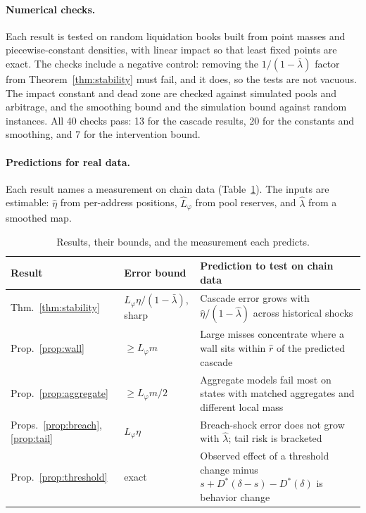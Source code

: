 \documentclass[letterpaper]{article} %
\theoremstyle{remark}
\newcommand{\Dstar}[1]{D^{\ast}_{#1}}
\newcommand{\Lp}{L_\varphi}
\newcommand{\lb}{\bar\lambda}
\begin{document}
\paragraph{Numerical checks.} Each result is tested on random liquidation books built from point masses and piecewise-constant densities, with linear impact so that least fixed points are exact. The checks include a negative control: removing the $1/(1-\lb)$ factor from Theorem~\ref{thm:stability} must fail, and it does, so the tests are not vacuous. The impact constant and dead zone are checked against simulated pools and arbitrage, and the smoothing bound and the simulation bound against random instances. All 40 checks pass: 13 for the cascade results, 20 for the constants and smoothing, and 7 for the intervention bound.

\paragraph{Predictions for real data.} Each result names a measurement on chain data (Table~\ref{tab:predictions}). The inputs are estimable: $\hat\eta$ from per-address positions, $\hat L_\varphi$ from pool reserves, and $\hat\lambda$ from a smoothed map.

\begin{table}[t]
\centering
\footnotesize
\begin{tabular}{@{}>{\raggedright\arraybackslash}p{}>{\raggedright\arraybackslash}p{}>{\raggedright\arraybackslash}p{}@{}}
\toprule
Result & Error bound & Prediction to test on chain data \\
\midrule
Thm.~\ref{thm:stability} & \mbox{$\Lp\eta/(1-\lb)$}, sharp & Cascade error grows with $\hat\eta/(1-\hat\lambda)$ across historical shocks \\
Prop.~\ref{prop:wall} & $\ge\Lp m$ & Large misses concentrate where a wall sits within $\hat r$ of the predicted cascade \\
Prop.~\ref{prop:aggregate} & $\ge\Lp m/2$ & Aggregate models fail most on states with matched aggregates and different local mass \\
Props.~\ref{prop:breach}, \ref{prop:tail} & $\Lp\eta$ & Breach-shock error does not grow with $\hat\lambda$; tail risk is bracketed \\
Prop.~\ref{prop:threshold} & exact & Observed effect of a threshold change minus $s+\Dstar{}(\delta-s)-\Dstar{}(\delta)$ is behavior change \\
\bottomrule
\end{tabular}
\caption{Results, their bounds, and the measurement each predicts.}
\label{tab:predictions}
\end{table}
\end{document}
